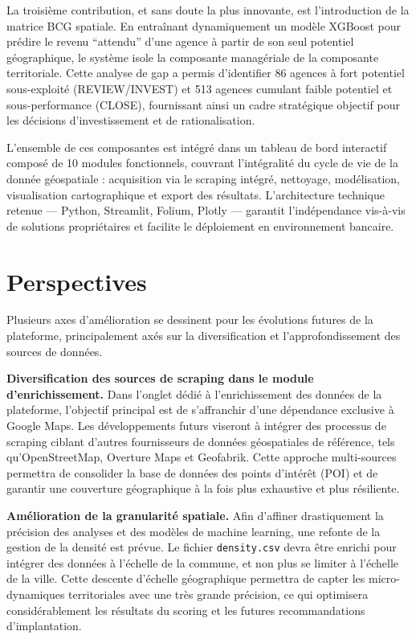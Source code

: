 \documentclass[11pt,a4paper,twoside]{report}
\begin{document}
La troisième contribution, et sans doute la plus innovante, est l'introduction de la matrice BCG spatiale. En entraînant dynamiquement un modèle XGBoost pour prédire le revenu ``attendu'' d'une agence à partir de son seul potentiel géographique, le système isole la composante managériale de la composante territoriale. Cette analyse de gap a permis d'identifier 86 agences à fort potentiel sous-exploité (REVIEW/INVEST) et 513 agences cumulant faible potentiel et sous-performance (CLOSE), fournissant ainsi un cadre stratégique objectif pour les décisions d'investissement et de rationalisation.

L'ensemble de ces composantes est intégré dans un tableau de bord interactif composé de 10 modules fonctionnels, couvrant l'intégralité du cycle de vie de la donnée géospatiale : acquisition via le scraping intégré, nettoyage, modélisation, visualisation cartographique et export des résultats. L'architecture technique retenue --- Python, Streamlit, Folium, Plotly --- garantit l'indépendance vis-à-vis de solutions propriétaires et facilite le déploiement en environnement bancaire.



\section*{Perspectives}

Plusieurs axes d'amélioration se dessinent pour les évolutions futures de la plateforme, principalement axés sur la diversification et l'approfondissement des sources de données.

\textbf{Diversification des sources de scraping dans le module d'enrichissement.} Dans l'onglet dédié à l'enrichissement des données de la plateforme, l'objectif principal est de s'affranchir d'une dépendance exclusive à Google Maps. Les développements futurs viseront à intégrer des processus de scraping ciblant d'autres fournisseurs de données géospatiales de référence, tels qu'OpenStreetMap, Overture Maps et Geofabrik. Cette approche multi-sources permettra de consolider la base de données des points d'intérêt (POI) et de garantir une couverture géographique à la fois plus exhaustive et plus résiliente.

\textbf{Amélioration de la granularité spatiale.} Afin d'affiner drastiquement la précision des analyses et des modèles de machine learning, une refonte de la gestion de la densité est prévue. Le fichier \texttt{density.csv} devra être enrichi pour intégrer des données à l'échelle de la commune, et non plus se limiter à l'échelle de la ville. Cette descente d'échelle géographique permettra de capter les micro-dynamiques territoriales avec une très grande précision, ce qui optimisera considérablement les résultats du scoring et les futures recommandations d'implantation.
\end{document}
